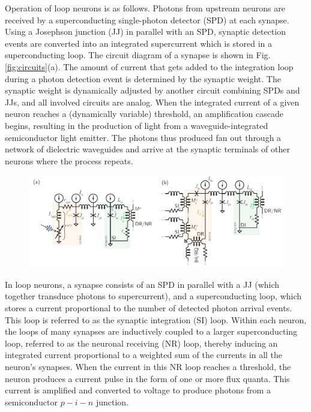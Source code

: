 \documentclass[]{article}
\begin{document}
Operation of loop neurons is as follows. Photons from upstream neurons are received by a superconducting single-photon detector (SPD) at each synapse. Using a Josephson junction (JJ) in parallel with an SPD, synaptic detection events are converted into an integrated supercurrent which is stored in a superconducting loop. The circuit diagram of a synapse is shown in Fig.\,\ref{fig:circuits}(a). The amount of current that gets added to the integration loop during a photon detection event is determined by the synaptic weight. The synaptic weight is dynamically adjusted by another circuit combining SPDs and JJs, and all involved circuits are analog. When the integrated current of a given neuron reaches a (dynamically variable) threshold, an amplification cascade begins, resulting in the production of light from a waveguide-integrated semiconductor light emitter. The photons thus produced fan out through a network of dielectric waveguides and arrive at the synaptic terminals of other neurons where the process repeats. 

\begin{figure}
\centering
\includegraphics[width=17.2cm]{_02__circuits.pdf}
\end{figure}
In loop neurons, a synapse consists of an SPD in parallel with a JJ (which together transduce photons to supercurrent), and a superconducting loop, which stores a current proportional to the number of detected photon arrival events. This loop is referred to as the synaptic integration (SI) loop. Within each neuron, the loops of many synapses are inductively coupled to a larger superconducting loop, referred to as the neuronal receiving (NR) loop, thereby inducing an integrated current proportional to a weighted sum of the currents in all the neuron's synapses. When the current in this NR loop reaches a threshold, the neuron produces a current pulse in the form of one or more flux quanta. This current is amplified and converted to voltage to produce photons from a semiconductor $p-i-n$ junction.
\end{document}
